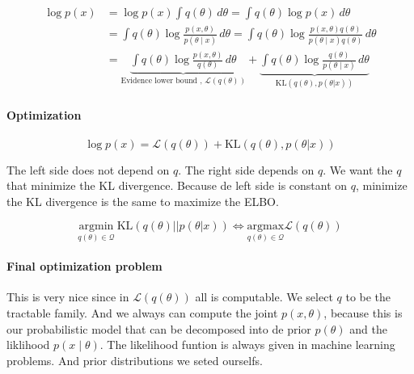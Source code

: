 
\begin{equation}
\begin{split}
 \log p(x) & = \log p(x) \int q(\theta) \, d\theta =  \int q(\theta) \log p(x) \, d\theta \\
 & = \int q(\theta) \log \frac{p(x,\theta)}{p(\theta \mid x)} \, d\theta =  \int q(\theta) \log \frac{p(x,\theta)q(\theta)}{p(\theta \mid x)q(\theta)} \, d\theta \\
 & = \underbrace{\int q(\theta) \log \frac{p(x,\theta)}{q(\theta)} \, d\theta}_{\text{Evidence lower bound , } \mathcal{L}(q(\theta)) } + \underbrace{\int q(\theta) \log \frac{q(\theta)}{p(\theta \mid x)} \, d\theta}_{\text{KL}(q(\theta),p(\theta|x))} 
\end{split}
\end{equation}


\paragraph{Optimization}

\begin{equation}
  \log p(x) =  \mathcal{L}(q(\theta))  + \text{KL}(q(\theta),p(\theta|x))
\end{equation}

The left side does not depend on $q$.
The right side depends on $q$.
We want the $q$ that minimize the KL divergence.
Because de left side is constant on $q$, minimize the KL divergence is the same to maximize the ELBO.

\begin{equation}
 \underset{q(\theta) \in \mathcal{Q}}{\text{argmin}} \ \text{KL}(q(\theta) || p(\theta|x)) \Leftrightarrow \underset{q(\theta) \in \mathcal{Q}}{\text{argmax}} \mathcal{L}(q(\theta)) 
\end{equation}

\paragraph{Final optimization problem}

This is very nice since in $\mathcal{L}(q(\theta)) $ all is computable.
We select $q$ to be the tractable family.
And we always can compute the joint $p(x,\theta)$, because this is our probabilistic model that can be decomposed into de prior $p(\theta)$ and the liklihood $p(x\mid \theta)$.
The likelihood funtion is always given in machine learning problems.
And prior distributions we seted ourselfs.

